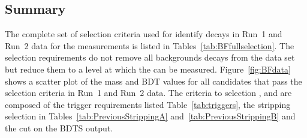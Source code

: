 \subsection{Summary}
\label{sec:BFsummary}
The complete set of selection criteria used for identify \bmumu decays in Run~1 and Run~2 data for the \BF measurements is listed in Tables~\ref{tab:BFfullselection}. %
The selection requirements do not remove all backgrounds decays from the data set but reduce them to a level at which the \BFs can be measured. Figure~\ref{fig:BFdata} shows a scatter plot of the mass and BDT values for all candidates that pass the selection criteria in Run~1 and Run~2 data.
The criteria to selection \bhh, \bujpsik and \bsjpsiphi are composed of the trigger requirements listed Table~\ref{tab:triggers}, the stripping selection in Tables~\ref{tab:PreviousStrippingA} and~\ref{tab:PreviousStrippingB} and the cut on the BDTS output.

